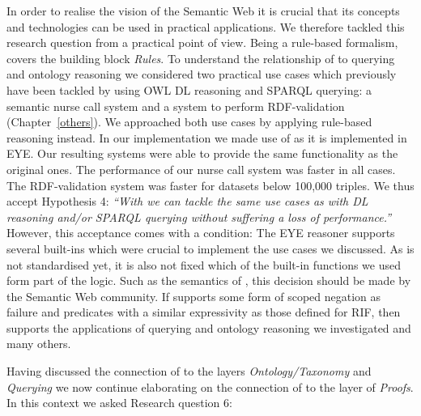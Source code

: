 In order to realise the vision of the Semantic Web it is crucial that its concepts and technologies can be used in practical applications. We therefore 
tackled this research question  from a practical point of view. Being a rule-based formalism, \nthree covers the building block \emph{Rules}.
To understand the relationship of \nthree to querying and ontology reasoning we 
%
% 
considered two practical use cases which previously have been tackled by using OWL DL reasoning and SPARQL querying: a semantic nurse call 
system and a system to perform RDF-validation (Chapter~\ref{others}). %
We approached both use cases by applying rule-based reasoning instead. In our implementation we made use of \nthree %
as it is implemented in EYE.
Our resulting systems were able to provide the same functionality as the original ones.
The performance of our nurse call system was faster in all cases.  
The RDF-validation system was faster for datasets below 100,000 triples. 
We thus accept %
Hypothesis 4:
\emph{
``With \nthreelogic %
we can tackle the same use cases as with \owl DL reasoning and/or SPARQL querying without suffering a loss of performance.''
} However, this acceptance comes with a condition: The EYE reasoner supports several built-ins which were crucial to implement the use cases we discussed. 
As \nthreelogic is not standardised yet, it is also not fixed which of the built-in functions we used form part of the logic. Such as the semantics of \nthree, this decision should be 
made by the Semantic Web community. If \nthree supports some form of scoped negation as failure and predicates with a similar expressivity as those defined for RIF, then \nthree supports 
the
applications of querying and ontology reasoning we investigated and many others.


Having discussed the connection of \nthreelogic to the layers \emph{Ontology/Taxonomy} and \emph{Querying} we now continue elaborating on the connection
of \nthree to the layer of \emph{Proofs}. In this context we asked Research question 6:


